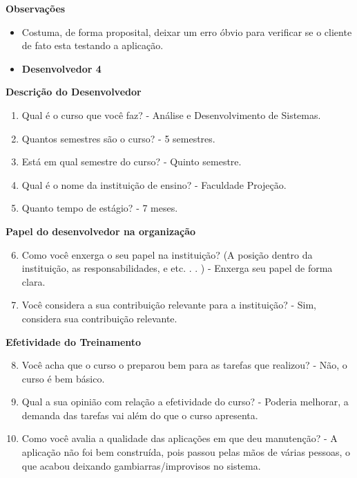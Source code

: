 \begin{apendicesenv}
\textbf{Observações}
\begin{itemize}
	\item Costuma, de forma proposital, deixar um erro óbvio para verificar se o cliente de fato esta testando a aplicação.
\end{itemize}


\begin{itemize}
	\item \textbf{Desenvolvedor 4}
\end{itemize}

\textbf{Descrição do Desenvolvedor}

\begin{enumerate}
	\item Qual é o curso que você faz?\newline
	- Análise e Desenvolvimento de Sistemas.
	\item Quantos semestres são o curso?\newline
	- 5 semestres.
	\item Está em qual semestre do curso?\newline
	- Quinto semestre.
	\item Qual é o nome da instituição de ensino?\newline
	- Faculdade Projeção.
	\item Quanto tempo de estágio?\newline
	- 7 meses.
\end{enumerate}

\textbf{Papel do desenvolvedor na organização}

\begin{enumerate}
	\setcounter{enumi}{5}
	\item Como você enxerga o seu papel na instituição? (A posição dentro da instituição, as
	responsabilidades, e etc. . . )\newline
	- Enxerga seu papel de forma clara.
	\item Você considera a sua contribuição relevante para a instituição?\newline
	- Sim, considera sua contribuição relevante.
\end{enumerate}

\textbf{Efetividade do Treinamento}

\begin{enumerate}
	\setcounter{enumi}{7}
	\item Você acha que o curso o preparou bem para as tarefas que realizou?\newline
	- Não, o curso é bem básico.
	\item Qual a sua opinião com relação a efetividade do curso?\newline
	- Poderia melhorar, a demanda das tarefas vai além do que o curso apresenta.
	\item Como você avalia a qualidade das aplicações em que deu manutenção?\newline
	- A aplicação não foi bem construída, pois passou pelas mãos de várias pessoas, o que acabou deixando gambiarras/improvisos no sistema.
\end{enumerate}


\end{apendicesenv}
